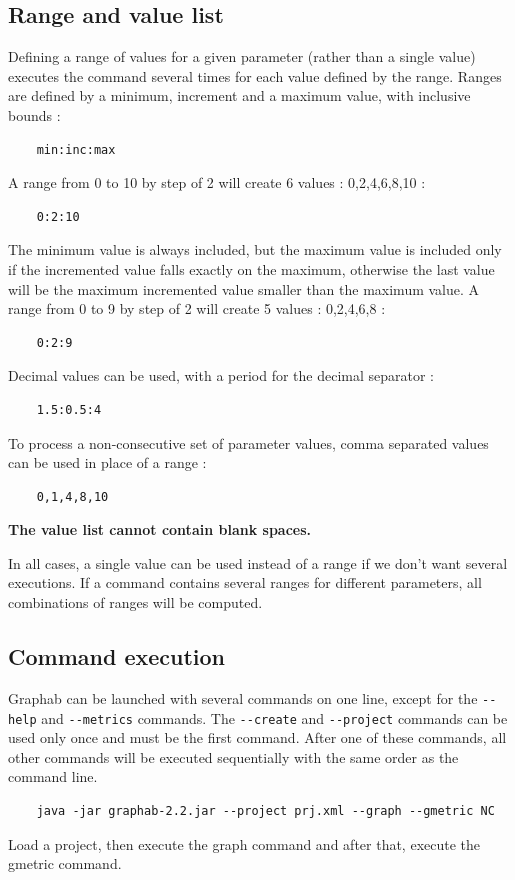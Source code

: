 \documentclass[a4paper,10pt]{report}
\begin{document}
\subsection{Range and value list}
Defining a range of values for a given parameter (rather than a single value) executes the command several times for each value defined by the range.
Ranges are defined by a minimum, increment and a maximum value, with inclusive bounds :
\begin{Verbatim}
	min:inc:max
\end{Verbatim}
A range from 0 to 10 by step of 2 will create 6 values : 0,2,4,6,8,10 :
\begin{Verbatim}
	0:2:10
\end{Verbatim}
The minimum value is always included, but the maximum value is included only if the incremented value falls exactly on the maximum, 
otherwise the last value will be the maximum incremented value smaller than the maximum value.
A range from 0 to 9 by step of 2 will create 5 values : 0,2,4,6,8 :
\begin{Verbatim}
	0:2:9
\end{Verbatim}
Decimal values can be used, with a period for the decimal separator : 
\begin{Verbatim}
	1.5:0.5:4
\end{Verbatim}
To process a non-consecutive set of parameter values, comma separated values can be used in place of a range :
\begin{Verbatim}
	0,1,4,8,10
\end{Verbatim}
\textbf{The value list cannot contain blank spaces.}

In all cases, a single value can be used instead of a range if we don't want several executions.
If a command contains several ranges for different parameters, all combinations of ranges will be computed.

\subsection{Command execution}
Graphab can be launched with several commands on one line, except for the \verb|--help| and \verb|--metrics| commands.
The \verb|--create| and \verb|--project| commands can be used only once and must be the first command. 
After one of these commands, all other commands will be executed sequentially with the same order as the command line.

\begin{Verbatim}
	java -jar graphab-2.2.jar --project prj.xml --graph --gmetric NC  
\end{Verbatim}
Load a project, then execute the graph command and after that, execute the gmetric command.
\end{document}
